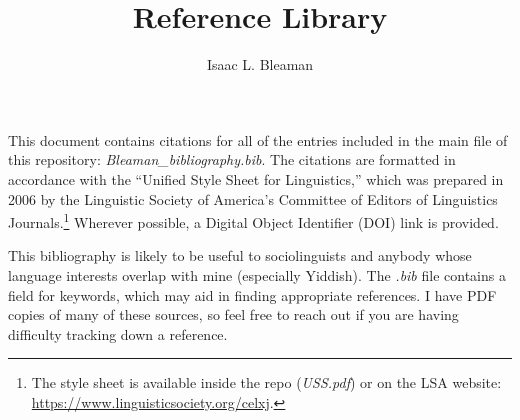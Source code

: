 \documentclass[12pt]{article}
\title{Reference Library}
\author{Isaac L. Bleaman}
\begin{document}
	\maketitle
	
	This document contains citations for all of the entries included in the main  file of this repository: \textit{Bleaman\_bibliography.bib}. The citations are formatted in accordance with the ``Unified Style Sheet for Linguistics,'' which was prepared in 2006 by the Linguistic Society of America's Committee of Editors of Linguistics Journals.\footnote{The style sheet is available inside the repo (\textit{USS.pdf}) or on the LSA website: \url{https://www.linguisticsociety.org/celxj}.} Wherever possible, a Digital Object Identifier (DOI) link is provided.
	
	This bibliography is likely to be useful to sociolinguists and anybody whose language interests overlap with mine (especially Yiddish). The \textit{.bib} file contains a field for keywords, which may aid in finding appropriate references. I have PDF copies of many of these sources, so feel free to reach out if you are having difficulty tracking down a reference.
	
	\nocite{*}
	
	\newpage
	
	
	
\end{document}

